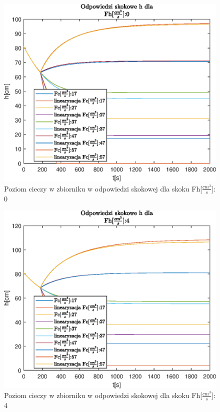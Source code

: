 \begin{figure}[h!]
   \centering
   \includegraphics{img/step-responses/h/stepResponseHFh0.eps}
   \caption{Poziom cieczy w zbiorniku w odpowiedzi skokowej dla skoku Fh[$\frac{cm^3}{s}$]: 0}
   \label{fig:stepResponseHFh0}
\end{figure}
            
\begin{figure}[h!]
   \centering
   \includegraphics{img/step-responses/h/stepResponseHFh4.eps}
   \caption{Poziom cieczy w zbiorniku w odpowiedzi skokowej dla skoku Fh[$\frac{cm^3}{s}$]: 4}
   \label{fig:stepResponseHFh4}
\end{figure}
            
